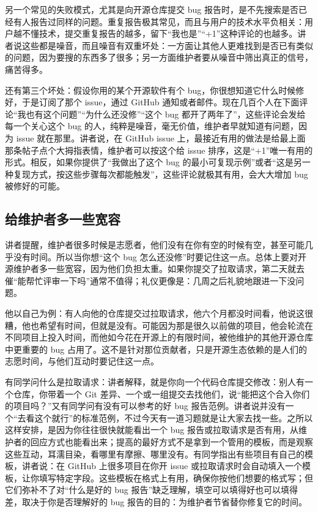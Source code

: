 \documentclass[a4paper]{article}
\begin{document}
另一个常见的失败模式，尤其是向开源仓库提交 bug 报告时，是不先搜索是否已经有人报告过同样的问题。重复报告极其常见，而且与用户的技术水平负相关：用户越不懂技术，提交重复报告的越多，留下“我也是”“+1”这种评论的也越多。讲者说这些都是噪音，而且噪音有双重坏处：一方面让其他人更难找到是否已有类似的问题，因为要搜的东西多了很多；另一方面维护者要从噪音中筛出真正的信号，痛苦得多。

还有第三个坏处：假设你用的某个开源软件有个 bug，你很想知道它什么时候修好，于是订阅了那个 issue，通过 GitHub 通知或者邮件。现在几百个人在下面评论“我也有这个问题”“为什么还没修”“这个 bug 都开了两年了”，这些评论会发给每一个关心这个 bug 的人，纯粹是噪音，毫无价值，维护者早就知道有问题，因为 issue 就在那里。讲者说，在 GitHub issue 上，最接近有用的做法是给最上面那条帖子点个大拇指表情，维护者可以按这个给 issue 排序，这是“+1”唯一有用的形式。相反，如果你提供了“我做出了这个 bug 的最小可复现示例”或者“这是另一种复现方式，按这些步骤每次都能触发”，这些评论就极其有用，会大大增加 bug 被修好的可能。

\subsection{给维护者多一些宽容}

讲者提醒，维护者很多时候是志愿者，他们没有在你有空的时候有空，甚至可能几乎没有时间。所以当你想“这个 bug 怎么还没修”时要记住这一点。总体上要对开源维护者多一些宽容，因为他们负担太重。如果你提交了拉取请求，第二天就去催“能帮忙评审一下吗”通常不值得；礼仪更像是：几周之后礼貌地跟进一下没问题。

他以自己为例：有人向他的仓库提交过拉取请求，他六个月都没时间看，他说这很糟，他也希望有时间，但就是没有。可能因为那是很久以前做的项目，他会轮流在不同项目上投入时间，而他如今花在开源上的有限时间，被他维护的其他开源仓库中更重要的 bug 占用了。这不是针对那位贡献者，只是开源生态依赖的是人们的志愿时间，与他们互动时要记住这一点。

有同学问什么是拉取请求：讲者解释，就是你向一个代码仓库提交修改：别人有一个仓库，你带着一个 Git 差异、一个或一组提交去找他们，说“能把这个合入你们的项目吗？”又有同学问有没有可以参考的好 bug 报告范例。讲者说并没有一个“去看这个就行”的标准范例，不过今天有一道习题就是让大家去找一些。之所以这样安排，是因为你往往很快就能看出一个 bug 报告或拉取请求是否有用，从维护者的回应方式也能看出来；提高的最好方式不是拿到一个管用的模板，而是观察这些互动，耳濡目染，看哪里有摩擦、哪里没有。有同学指出有些项目有自己的模板，讲者说：在 GitHub 上很多项目在你开 issue 或拉取请求时会自动填入一个模板，让你填写特定字段。这些模板在格式上有用，确保你按他们想要的格式写；但它们弥补不了对“什么是好的 bug 报告”缺乏理解，填空可以填得好也可以填得差，取决于你是否理解好的 bug 报告的目的：为维护者节省替你修复它的时间。
\end{document}
